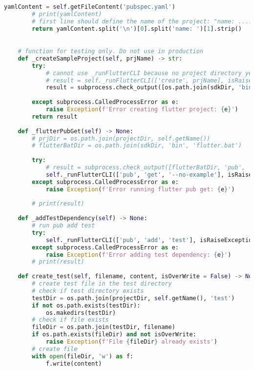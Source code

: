 \begin{lstlisting}[language=Python, caption={$\texttt{Flutter}$ class - subclass of Project.}, label={lst:2}]
        yamlContent = self.getFileContent('pubspec.yaml')
        # print(yamlContent)
        # first line should define the name of the project: "name: ....."
        return yamlContent.split('\n')[0].split('name: ')[1].strip()

    
    # function for testing only. Do not use in production
    def _createSampleProject(self, prjName) -> str:
        try:
            # cannot use _runFlutterCLI because no project directory yet
            # result = self._runFlutterCLI(['create', prjName], isRaiseException=True)
            result = subprocess.check_output([os.path.join(sdkDir, 'bin', 'flutter'), 'create', prjName],cwd=projectDir, universal_newlines=True, encoding='utf-8',  shell=True)
            
        except subprocess.CalledProcessError as e:
            raise Exception(f'Error creating flutter project: {e}')
        return result
    
    def _flutterPubGet(self) -> None:
        # prjDir = os.path.join(projectDir, self.getName())
        # flutterBatDir = os.path.join(sdkDir, 'bin', 'flutter.bat')
        
        try:
            # result = subprocess.check_output([flutterBatDir, 'pub', 'get'], cwd=prjDir, universal_newlines=True)
            self._runFlutterCLI(['pub', 'get', '--no-example'], isRaiseException=True)
        except subprocess.CalledProcessError as e:
            raise Exception(f'Error running flutter pub get: {e}')
        
        # print(result)
        
    def _addTestDependency(self) -> None:
        # run pub add test
        try:
            self._runFlutterCLI(['pub', 'add', 'test'], isRaiseException=True)
        except subprocess.CalledProcessError as e:
            raise Exception(f'Error adding test dependency: {e}')
        # print(result)
    
    def create_test(self, filename, content, isOverWrite = False) -> None:
        # create test file in the test directory
        # check if test directory exists
        testDir = os.path.join(projectDir, self.getName(), 'test')
        if not os.path.exists(testDir):
            os.makedirs(testDir)
        # check if file exists
        fileDir = os.path.join(testDir, filename)
        if os.path.exists(fileDir) and not isOverWrite:
            raise Exception(f'File {fileDir} already exists')
        # create file
        with open(fileDir, 'w') as f:
            f.write(content)
            

\end{lstlisting}
